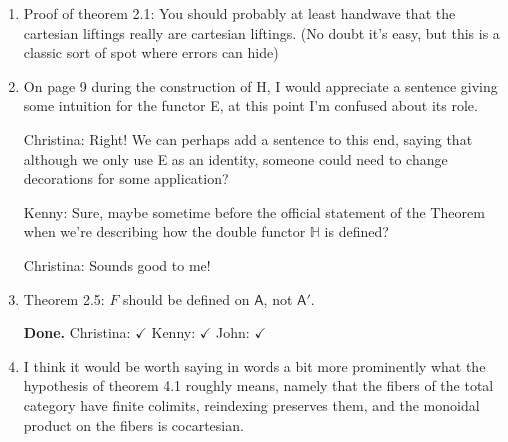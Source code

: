 \documentclass[reqno]{amsart}
\def\chris{\color{purple} Christina: }
\def\john{\color{red} John: }
\def\kenny{\color{blue} Kenny: }
\begin{document}
\begin{enumerate}



\item Proof of theorem 2.1: You should probably at least handwave that the cartesian liftings really are cartesian liftings. (No doubt it’s easy, but 
this 
is a classic sort of spot where errors can hide)

\item On page 9 during the construction of H, I would appreciate a sentence giving some intuition for the functor E, at this point I’m confused about 
its 
role.

{}

{\chris Right! We can perhaps add a sentence to this end, saying that although we only use E as an identity, someone could need to change decorations 
for some application?}

{\kenny Sure, maybe sometime before the official statement of the Theorem when we're describing how the double functor $\mathbb{H}$ is defined?}

{\chris Sounds good to me!}

\item Theorem 2.5: $F$ should be defined on $\mathsf{A}$, not $\mathsf{A}'$.

{\bf Done.} {\chris $\checkmark$} {\kenny $\checkmark$} {\john $\checkmark$}

\item I think it would be worth saying in words a bit more prominently what the hypothesis of theorem 4.1 roughly means, namely that the fibers of 
the total 
category have finite colimits, reindexing preserves them, and the monoidal product on the fibers is cocartesian.


\end{enumerate}
\end{document}
